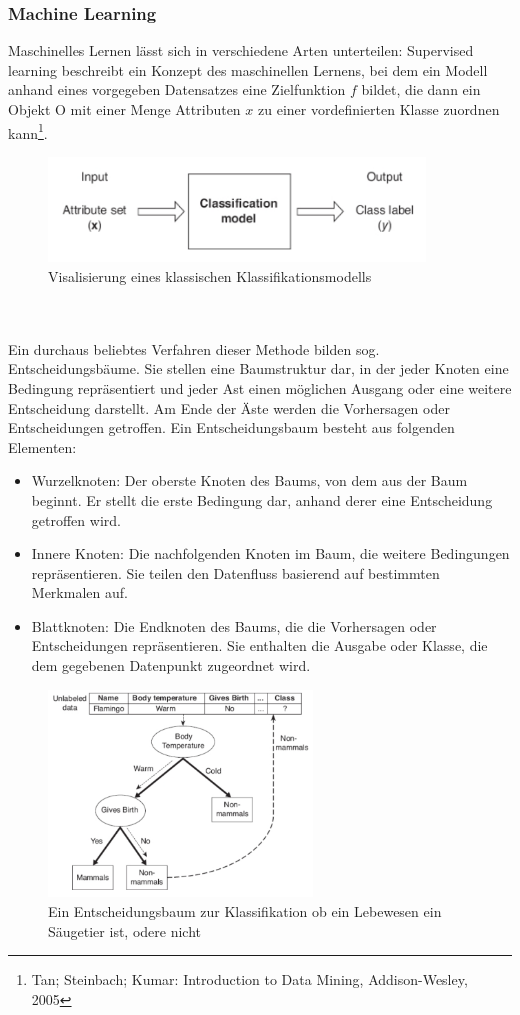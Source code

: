 \documentclass[11pt,a4paper]{article}
\begin{document}
\subsubsection{Machine Learning}
Maschinelles Lernen lässt sich in verschiedene Arten unterteilen:
Supervised learning beschreibt ein Konzept des maschinellen Lernens, bei dem ein Modell anhand eines vorgegeben Datensatzes eine Zielfunktion $f$ bildet, die dann ein Objekt O mit einer Menge Attributen $x$ zu einer vordefinierten Klasse zuordnen kann\footnote{Tan; Steinbach; Kumar: Introduction to Data Mining, Addison-Wesley, 2005}.
\begin{figure}[h]
\includegraphics[width=100mm,scale=1, center]{entscheidungsbaum_diagramm.png}
\caption{Visalisierung eines klassischen Klassifikationsmodells}
\label{fig:figure1}
\end{figure}
\\\\Ein durchaus beliebtes Verfahren dieser Methode bilden sog. Entscheidungsbäume. 
Sie stellen eine Baumstruktur dar, in der jeder Knoten eine Bedingung repräsentiert und jeder Ast einen möglichen Ausgang oder eine weitere Entscheidung darstellt. Am Ende der Äste werden die Vorhersagen oder Entscheidungen getroffen.
Ein Entscheidungsbaum besteht aus folgenden Elementen:
\begin{itemize}

\item Wurzelknoten: Der oberste Knoten des Baums, von dem aus der Baum beginnt. Er stellt die erste Bedingung dar, anhand derer eine Entscheidung getroffen wird.
\item Innere Knoten: Die nachfolgenden Knoten im Baum, die weitere Bedingungen repräsentieren. Sie teilen den Datenfluss basierend auf bestimmten Merkmalen auf.
\item Blattknoten: Die Endknoten des Baums, die die Vorhersagen oder Entscheidungen repräsentieren. Sie enthalten die Ausgabe oder Klasse, die dem gegebenen Datenpunkt zugeordnet wird.
\end{itemize}
\begin{figure}[h!]
\includegraphics[width=70mm, scale=0.3, center]{entscheidungsbaum.png}
\caption{Ein Entscheidungsbaum zur Klassifikation ob ein Lebewesen ein Säugetier ist, odere nicht}
\label{fig:figure2}
\end{figure}
\end{document}
